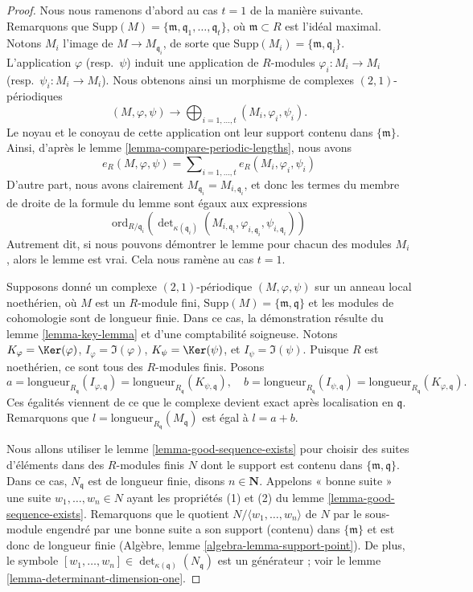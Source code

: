 \begin{proof}
Nous nous ramenons d'abord au cas $t = 1$ de la manière suivante.
Remarquons que
$\text{Supp}(M) = \{\mathfrak m, \mathfrak q_1, \ldots, \mathfrak q_t\}$,
où $\mathfrak m \subset R$ est l'idéal maximal.
Notons $M_i$ l'image de $M \to M_{\mathfrak q_i}$,
de sorte que $\text{Supp}(M_i) = \{\mathfrak m, \mathfrak q_i\}$.
L'application $\varphi$ (resp.\ $\psi$) induit une application de $R$-modules
$\varphi_i : M_i \to M_i$ (resp.\ $\psi_i : M_i \to M_i$).
Nous obtenons ainsi un morphisme de complexes $(2, 1)$-périodiques
$$
(M, \varphi, \psi) \longrightarrow
\bigoplus\nolimits_{i = 1, \ldots, t} (M_i, \varphi_i, \psi_i).
$$
Le noyau et le conoyau de cette application ont leur support contenu dans
$\{\mathfrak m\}$. Ainsi, d'après le lemme \ref{lemma-compare-periodic-lengths},
nous avons
$$
e_R(M, \varphi, \psi) =
\sum\nolimits_{i = 1, \ldots, t}
e_R(M_i, \varphi_i, \psi_i)
$$
D'autre part, nous avons clairement $M_{\mathfrak q_i} = M_{i, \mathfrak q_i}$,
et donc les termes du membre de droite de la formule du
lemme sont égaux aux expressions
$$
\text{ord}_{R/\mathfrak q_i}\left(
\det\nolimits_{\kappa(\mathfrak q_i)}
(M_{i, \mathfrak q_i}, \varphi_{i, \mathfrak q_i}, \psi_{i, \mathfrak q_i})
\right)
$$
Autrement dit, si nous pouvons démontrer le lemme pour chacun des modules
$M_i$, alors le lemme est vrai. Cela nous ramène au cas $t = 1$.

\medskip\noindent
Supposons donné un complexe $(2, 1)$-périodique $(M, \varphi, \psi)$
sur un anneau local noethérien, où $M$ est un $R$-module fini,
$\text{Supp}(M) = \{\mathfrak m, \mathfrak q\}$ et les modules de cohomologie
sont de longueur finie. Dans ce cas, la démonstration
résulte du lemme \ref{lemma-key-lemma} et d'une comptabilité soigneuse.
Notons
$K_\varphi = \Ker(\varphi)$,
$I_\varphi = \Im(\varphi)$,
$K_\psi = \Ker(\psi)$, et
$I_\psi = \Im(\psi)$.
Puisque $R$ est noethérien, ce sont tous des $R$-modules finis.
Posons
$$
a = \text{longueur}_{R_{\mathfrak q}}(I_{\varphi, \mathfrak q})
= \text{longueur}_{R_{\mathfrak q}}(K_{\psi, \mathfrak q}),
\quad
b = \text{longueur}_{R_{\mathfrak q}}(I_{\psi, \mathfrak q})
= \text{longueur}_{R_{\mathfrak q}}(K_{\varphi, \mathfrak q}).
$$
Ces égalités viennent de ce que le complexe devient exact après localisation en
$\mathfrak q$. Remarquons que $l = \text{longueur}_{R_{\mathfrak q}}(M_{\mathfrak q})$
est égal à $l = a + b$.

\medskip\noindent
Nous allons utiliser le lemme \ref{lemma-good-sequence-exists}
pour choisir des suites d'éléments dans des $R$-modules finis
$N$ dont le support est contenu dans $\{\mathfrak m, \mathfrak q\}$.
Dans ce cas, $N_{\mathfrak q}$ est de longueur finie, disons $n \in \mathbf{N}$.
Appelons « bonne suite » une suite $w_1, \ldots, w_n \in N$
ayant les propriétés (1) et (2) du lemme \ref{lemma-good-sequence-exists}.
Remarquons que le quotient
$N/\langle w_1, \ldots, w_n \rangle$ de $N$ par le sous-module engendré par
une bonne suite a son support (contenu) dans $\{\mathfrak m\}$
et est donc de longueur finie (Algèbre, lemme \ref{algebra-lemma-support-point}).
De plus, le symbole
$[w_1, \ldots, w_n] \in \det_{\kappa(\mathfrak q)}(N_{\mathfrak q})$
est un générateur ; voir le lemme \ref{lemma-determinant-dimension-one}.


\end{proof}
